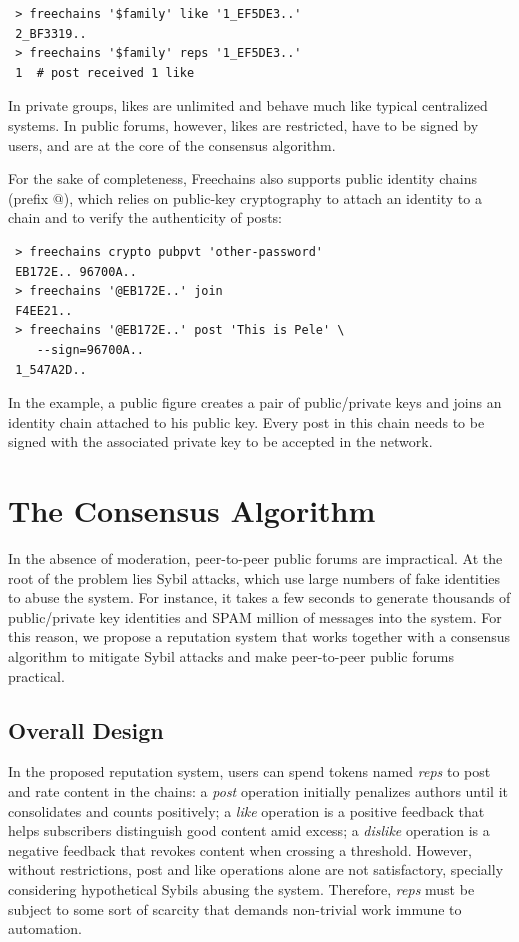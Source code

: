 \documentclass[10pt,journal,compsoc]{IEEEtran}
\newcommand{\FC}       {Freechains\xspace}
\newcommand{\reps}     {\emph{reps}\xspace}
\begin{document}
{\footnotesize
\begin{verbatim}
 > freechains '$family' like '1_EF5DE3..'
 2_BF3319..
 > freechains '$family' reps '1_EF5DE3..'
 1  # post received 1 like
\end{verbatim}
}

In private groups, likes are unlimited and behave much like typical centralized
systems.
In public forums, however, likes are restricted, have to be signed by users,
and are at the core of the consensus algorithm.

For the sake of completeness, \FC also supports public identity chains (prefix
$@$), which relies on public-key cryptography to attach an identity to a chain
and to verify the authenticity of posts:

{\footnotesize
\begin{verbatim}
 > freechains crypto pubpvt 'other-password'
 EB172E.. 96700A..
 > freechains '@EB172E..' join
 F4EE21..
 > freechains '@EB172E..' post 'This is Pele' \
    --sign=96700A..
 1_547A2D..
\end{verbatim}
}

In the example, a public figure creates a pair of public/private keys and joins
an identity chain attached to his public key.
Every post in this chain needs to be signed with the associated private key to
be accepted in the network.

\section{The Consensus Algorithm}
\label{sec.consensus}

In the absence of moderation, peer-to-peer public forums are impractical.
At the root of the problem lies Sybil attacks, which use large numbers of fake
identities to abuse the system.
For instance, it takes a few seconds to generate thousands of public/private
key identities and SPAM million of messages into the system.
For this reason, we propose a reputation system that works together with a
consensus algorithm to mitigate Sybil attacks and make peer-to-peer public
forums practical.

\subsection{Overall Design}

In the proposed reputation system, users can spend tokens named \reps to post
and rate content in the chains:
a \emph{post} operation initially penalizes authors until it consolidates and
counts positively;
a \emph{like} operation is a positive feedback that helps subscribers
distinguish good content amid excess;
a \emph{dislike} operation is a negative feedback that revokes content when
crossing a threshold.
%
However, without restrictions, post and like operations alone are not
satisfactory, specially considering hypothetical Sybils abusing the system.
Therefore, \reps must be subject to some sort of scarcity that demands
non-trivial work immune to automation.
\end{document}
